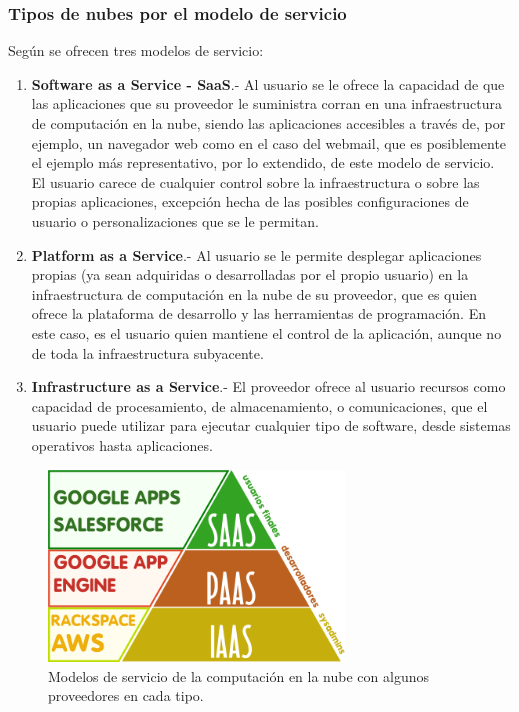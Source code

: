 \subsubsection{Tipos de nubes por el modelo de servicio}
Según \cite{nist} se ofrecen tres modelos de servicio:
\begin{enumerate}
    \item \textbf{Software as a Service - SaaS}.- Al usuario se le ofrece la
          capacidad de que las aplicaciones  que  su  proveedor  le  suministra
          corran  en  una  infraestructura de computación en la nube, siendo las aplicaciones accesibles
          a través de, por ejemplo, un navegador web como en el caso del webmail,
          que es posiblemente el ejemplo más representativo, por lo extendido,
          de este modelo de servicio. El usuario carece de cualquier control sobre
          la infraestructura o sobre las propias aplicaciones, excepción hecha
          de las posibles configuraciones de usuario o personalizaciones que se
          le permitan.
    \item \textbf{Platform as a Service}.- Al usuario se le permite desplegar
          aplicaciones propias  (ya  sean  adquiridas  o  desarrolladas  por  el
          propio  usuario)  en  la  infraestructura de computación en la nube de  su  proveedor, que
          es  quien  ofrece  la  plataforma  de desarrollo y las herramientas de
          programación. En este caso, es el usuario quien mantiene el control de
          la aplicación, aunque no de toda la infraestructura subyacente.
    \item \textbf{Infrastructure as a Service}.- El proveedor ofrece al usuario
          recursos como capacidad  de  procesamiento,  de  almacenamiento,  o
          comunicaciones, que el usuario puede utilizar para ejecutar cualquier
          tipo de software, desde sistemas operativos hasta aplicaciones.
\end{enumerate}

\begin{figure}[h]
    \centering
    \captionsetup{justification=centering}
    \includegraphics[width=0.7\textwidth]{Imagenes/Bitmap/cloud1}
    \caption{Modelos de servicio de la computación en la nube con algunos proveedores en cada tipo.}
    \label{fig:cloud1}
\end{figure}

